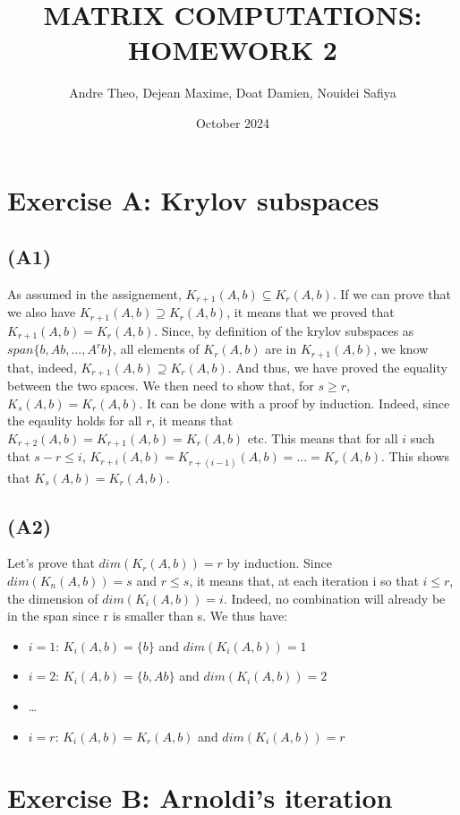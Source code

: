 \documentclass{article}
\title{\textbf{MATRIX COMPUTATIONS: HOMEWORK 2}}  %
\author{Andre Theo,
Dejean Maxime,
Doat Damien,
Nouidei Safiya}
\date{October 2024}
\begin{document}
\maketitle

\section{Exercise A: Krylov subspaces}
\subsection*{(A1)}
As assumed in the assignement, $K_{r+1}(A,b) \subseteq K_{r}(A,b) $. 
If we can prove that we also have $K_{r+1}(A,b) \supseteq K_{r}(A,b) $, it means that we proved that $K_{r+1}(A,b) = K_{r}(A,b) $. 
Since, by definition of the krylov subspaces as $span\{b, Ab, ..., A^rb\}$,  all elements of $K_{r}(A,b)$ are in $K_{r+1}(A,b)$, we know that, indeed, $K_{r+1}(A,b) \supseteq K_{r}(A,b) $. And thus, we have proved the equality between the two spaces. 
We then need to show that, for $s\geq r$, $K_{s}(A,b) = K_{r}(A,b) $. It can be done with a proof by induction. 
Indeed, since the eqaulity holds for all $r$, it means that $K_{r+2}(A,b) = K_{r+1}(A,b) = K_{r}(A,b) $ etc. This means that for all $i$ such that $s-r\leq i$, $K_{r+i}(A,b) = K_{r+(i-1)}(A,b) =... =  K_{r}(A,b) $. 
This shows that $K_{s}(A,b) = K_{r}(A,b) $.


\subsection*{(A2)}
Let's prove that $ dim( K_r (A,b)) = r$ by induction. Since $ dim( K_n (A,b)) = s$ and $r \leq s$, it means that, 
at each iteration i so that $i \leq r$, the dimension of  $ dim( K_i (A,b)) = i$. Indeed, no combination will already be in the span
since r is smaller than s. 
We thus have:
\begin{itemize}
    \item $i = 1$: $ K_i (A,b) = \{b\}$ and $dim( K_i (A,b)) = 1$
    \item $i = 2$: $ K_i (A,b) = \{b, Ab\}$ and $dim( K_i (A,b)) = 2$
    \item \dots
    \item $i = r$: $ K_i (A,b) = K_r (A,b) $ and $dim( K_i (A,b)) = r$
\end{itemize}

\section{Exercise B: Arnoldi’s iteration}
\end{document}
